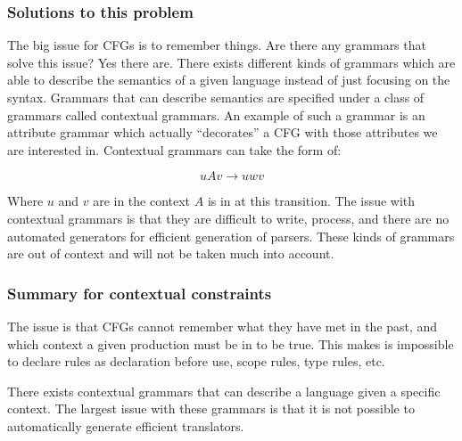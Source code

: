 \subsubsection*{Solutions to this problem}
The big issue for CFGs is to remember things. Are there any grammars
that solve this issue? Yes there are. There exists different kinds of
grammars which are able to describe the semantics of a given language
instead of just focusing on the syntax. Grammars that can describe
semantics are specified under a class of grammars called contextual
grammars. \cite{plpp} An example of such a grammar is an attribute
grammar which actually ``decorates'' a CFG with those attributes we are
interested in. \cite{attrgrammar} 
Contextual grammars can take the form of:

\[
  uAv \rightarrow uwv
\]

Where $u$ and $v$ are in the context $A$ is in at this transition. The
issue with contextual grammars is that they are difficult to write,
process, and there are no automated generators for efficient generation
of parsers. These kinds of grammars are out of context and will not be
taken much into account.

\cite{attrgrammar}

\subsubsection*{Summary for contextual constraints}
The issue is that CFGs cannot remember what they have met in the past, and
which context a given production must be in to be true. This makes is impossible
to declare rules as declaration before use, scope rules, type rules, etc.

There exists contextual grammars that can describe a language given a specific
context. The largest issue with these grammars is that it is not possible to
automatically generate efficient translators.
